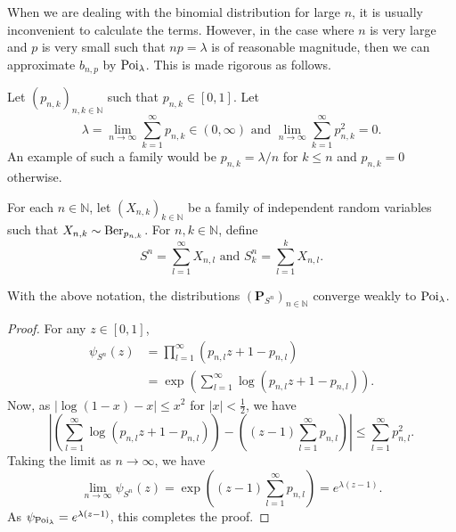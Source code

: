 When we are dealing with the binomial distribution for large $n$, it is usually inconvenient to calculate the terms. However, in the case where $n$ is very large and $p$ is very small such that $np=\lambda$ is of reasonable magnitude, then we can approximate $b_{n,p}$ by $\operatorname{Poi}_\lambda$. This is made rigorous as follows.

\vspace{2mm}
Let $(p_{n,k})_{n,k\in\mathbb{N}}$ such that $p_{n,k}\in[0,1]$. Let
$$\lambda=\lim_{n\to\infty}\sum_{k=1}^\infty p_{n,k}\in(0,\infty) \text{ and }\lim_{n\to\infty}\sum_{k=1}^\infty p_{n,k}^2 = 0.$$
An example of such a family would be $p_{n,k}=\lambda/n$ for $k\leq n$ and $p_{n,k}=0$ otherwise.

For each $n\in\mathbb{N}$, let $(X_{n,k})_{k\in\mathbb{N}}$ be a family of independent random variables such that $X_{n,k}\sim\operatorname{Ber}_{p_{n,k}}$. For $n,k\in\mathbb{N}$, define
$$S^n = \sum_{l=1}^\infty X_{n,l}\text{ and }S_k^n = \sum_{l=1}^k X_{n,l}.$$

\begin{theorem}
    With the above notation, the distributions $(\textbf{P}_{S^n})_{n\in\mathbb{N}}$ converge weakly to $\operatorname{Poi}_{\lambda}$.
\end{theorem}
\begin{proof}
    For any $z\in[0,1]$,
    \begin{align*}
        \psi_{S^n}(z) &= \prod_{l=1}^\infty (p_{n,l}z + 1-p_{n,l}) \\
        &= \exp\left(\sum_{l=1}^\infty \log(p_{n,l}z + 1-p_{n,l})\right).
    \end{align*}
    Now, as $|\log(1-x)-x|\leq x^2$ for $|x|<\frac{1}{2}$, we have
    $$
        \left|\left(\sum_{l=1}^\infty \log(p_{n,l}z + 1-p_{n,l})\right) - \left((z-1)\sum_{l=1}^\infty p_{n,l}\right)\right| \leq \sum_{l=1}^\infty p_{n,l}^2.
    $$
    Taking the limit as $n\to\infty$, we have
    $$\lim_{n\to\infty} \psi_{S^n}(z) = \exp\left((z-1)\sum_{l=1}^\infty p_{n,l}\right) = e^{\lambda(z-1)}.$$
    As $\psi_{\operatorname{Poi}_{\lambda}} = e^{\lambda(z-1)}$, this completes the proof.
\end{proof}

